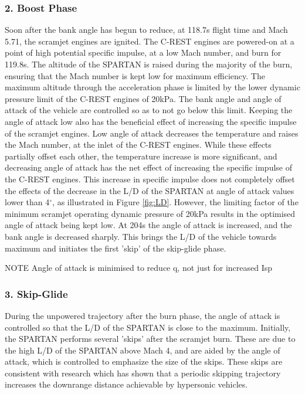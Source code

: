 \documentclass[journal]{new-aiaa} %
\begin{document}
\subsubsection{2. Boost Phase}
Soon after the bank angle has begun to reduce, at 118.7s flight time and Mach 5.71, the scramjet engines are ignited. The C-REST engines are powered-on at a point of high potential specific impulse, at a low Mach number, and burn for 119.8s. The altitude of the SPARTAN is raised during the majority of the burn, ensuring that the Mach number is kept low for maximum efficiency\cite{Preller2017}. The maximum altitude through the acceleration phase is limited by the lower dynamic pressure limit of the C-REST engines of 20kPa. The bank angle and angle of attack of the vehicle are controlled so as to not go below this limit. Keeping the angle of attack low also has the beneficial effect of increasing the specific impulse of the scramjet engines. Low angle of attack decreases the temperature and raises the Mach number, at the inlet of the C-REST engines. While these effects partially offset each other\cite{Preller2017}, the temperature increase is more significant, and decreasing angle of attack has the net effect of increasing the specific impulse of the C-REST engines. This increase in specific impulse does not completely offset the effects of the decrease in the L/D of the SPARTAN at angle of attack values lower than 4$^\circ$, as illustrated in Figure \ref{fig:LD}. However, the limiting factor of the minimum scramjet operating dynamic pressure of 20kPa results in the optimised angle of attack being kept low. At 204s the angle of attack is increased, and the bank angle is decreased sharply. This brings the L/D of the vehicle towards maximum and initiates the first 'skip' of the skip-glide phase.  

NOTE Angle of attack is minimised to reduce q, not just for increased Isp
\subsubsection{3. Skip-Glide}
During the unpowered trajectory after the burn phase, the angle of attack is controlled so that the L/D of the SPARTAN is close to the maximum. Initially, the SPARTAN performs several 'skips' after the scramjet burn. These are due to the high L/D of the SPARTAN above Mach 4, and are aided by the angle of attack, which is controlled to emphasize the size of the skips. These skips are consistent with research which has shown that a periodic skipping trajectory increases the downrange distance achievable by hypersonic vehicles\cite{Eggers1957,Kanda2007}. 
\end{document}
